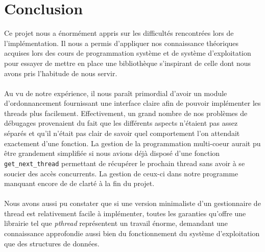 \documentclass{article}
\begin{document}
	\section{Conclusion}
    Ce projet nous a énormément appris sur les difficultés rencontrées lors
    de l'implémentation. Il nous a permis d'appliquer nos connaissance
    théoriques acquises lors des cours de programmation système et de système
    d'exploitation pour essayer de mettre en place une bibliothèque
    s'inspirant de celle dont nous avons pris l'habitude de nous servir.
    \paragraph{}
    Au vu de notre expérience, il nous paraît primordial d'avoir un module
    d'ordonnancement fournissant une interface claire afin de pouvoir
    implémenter les threads plus facilement. Effectivement, un grand nombre
    de nos problèmes de débugages provenaient du fait que les différents
    aspects n'étaient pas assez séparés et qu'il n'était pas clair de savoir
    quel comportement l'on attendait exactement d'une fonction. La gestion
    de la programmation multi-coeur aurait pu être grandement simplifiée si
    nous avions déjà disposé d'une fonction \verb!get_next_thread!
    permettant de récupérer le prochain thread sans avoir à se soucier des
    accès concurrents. La gestion de ceux-ci dans notre programme
    manquant encore de de clarté à la fin du projet.
    \paragraph{}
    Nous avons aussi pu constater que si une version minimaliste d'un
    gestionnaire de thread est relativement facile à implémenter, toutes les
    garanties qu'offre une librairie tel que {\em pthread} représentent un
    travail énorme, demandant une connaissance approfondie aussi bien du
    fonctionnement du système d'exploitation que des structures de données.
\end{document}
